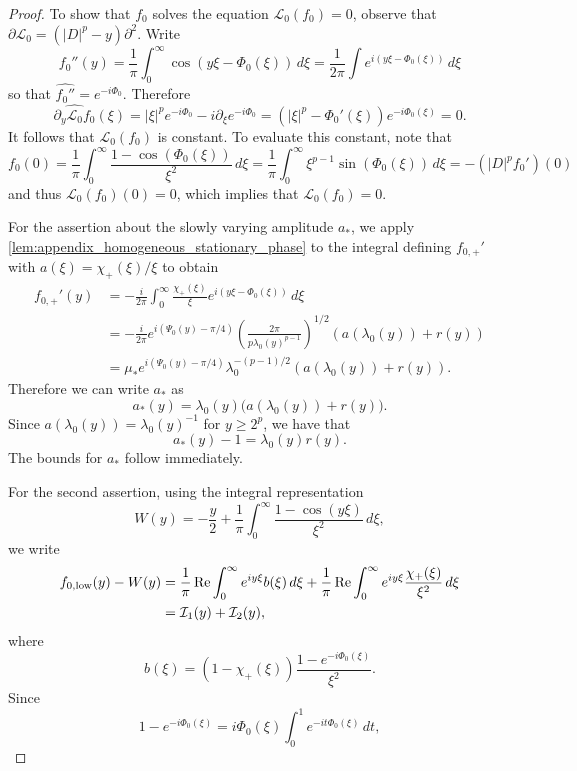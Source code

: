 \documentclass[11pt]{amsart}
\theoremstyle{definition}
\theoremstyle{remark}
\numberwithin{equation}{section}
\newcommand{\mc}[1]{\mathcal{#1}}
\begin{document}
\begin{proof}
    To show that $f_0$ solves the equation $\mc{L}_0(f_0) = 0$, observe that $\partial \mc{L}_0 = (|D|^p - y)\partial^2$. Write
    \[f_0''(y) = \frac{1}{\pi}\int_{0}^{\infty}\cos(y \xi - \Phi_0(\xi)) \, d\xi = \frac{1}{2\pi} \int e^{i(y \xi - \Phi_0(\xi))} \, d\xi\]
    so that $\widehat{f_0''} = e^{-i\Phi_0}$. Therefore
    \[\widehat{\partial_y \mc{L}_0 f_0}(\xi) = |\xi|^pe^{-i\Phi_0} - i \partial_\xi e^{-i\Phi_0} = (|\xi|^p - \Phi_0'(\xi))e^{-i\Phi_0(\xi)} = 0.\]
    It follows that $\mc{L}_0(f_0)$ is constant. To evaluate this constant, note that
    \[f_0(0) = \frac{1}{\pi}\int_{0}^{\infty}\frac{1 - \cos(\Phi_0(\xi))}{\xi^2} \, d\xi = \frac{1}{\pi}\int_{0}^{\infty}\xi^{p-1}\sin(\Phi_0(\xi)) \, d\xi = -(|D|^pf_0')(0)\]
    and thus $\mc{L}_0(f_0)(0) = 0$, which implies that $\mc{L}_0(f_0) = 0$. \par
    For the assertion about the slowly varying amplitude $a_*$, we apply \cref{lem:appendix_homogeneous_stationary_phase} to the integral defining $f_{0, +}'$ with $a(\xi) = \chi_+(\xi) / \xi$ to obtain 
    \begin{align*}
        f_{0, +}'(y) & = - \frac{i}{2\pi} \int_{0}^{\infty} \frac{\chi_+(\xi)}{\xi} e^{i(y\xi - \Phi_0(\xi))} \, d\xi \\
        & = -\frac{i}{2\pi} e^{i(\Psi_0(y) - \pi/4)}\left(\frac{2\pi}{p \lambda_0(y)^{p - 1}}\right)^{1/2}(a(\lambda_0(y)) + r(y)) \\
        & = \mu_* e^{i(\Psi_0(y) - \pi/4)}\lambda_0^{-(p-1)/2}(a(\lambda_0(y)) + r(y)). 
    \end{align*}
    Therefore we can write $a_*$ as
    \[a_*(y) = \lambda_0(y)\bigl(a(\lambda_0(y)) + r(y)\bigr).\]
    Since $a(\lambda_0(y)) = \lambda_0(y)^{-1}$ for $y \geq 2^p$, we have that
    \[a_*(y) - 1 = \lambda_0(y)r(y).\]
    The bounds for $a_*$ follow immediately. \par
    For the second assertion, using the integral representation
    \[W(y)=-\frac{y}{2}+\frac1\pi\int_0^\infty\frac{1-\cos(y\xi)}{\xi^2}\,d\xi,\]
    we write
    \begin{align*}
        f_{0,\textup{low}}(y)-W(y)
        &=\frac1\pi\operatorname{Re}\int_0^\infty e^{iy\xi}b(\xi)\,d\xi
        +\frac1\pi\operatorname{Re}\int_0^\infty e^{iy\xi}\frac{\chi_+(\xi)}{\xi^2}\,d\xi\\
        &=\mc{I}_1(y)+\mc{I}_2(y),
    \end{align*}
    where
    \[b(\xi)=(1-\chi_+(\xi))\frac{1-e^{-i\Phi_0(\xi)}}{\xi^2}.\]
    Since
    \[1-e^{-i\Phi_0(\xi)}=i\Phi_0(\xi)\int_0^1e^{-it\Phi_0(\xi)}\,dt,\]

\end{proof}
\end{document}
